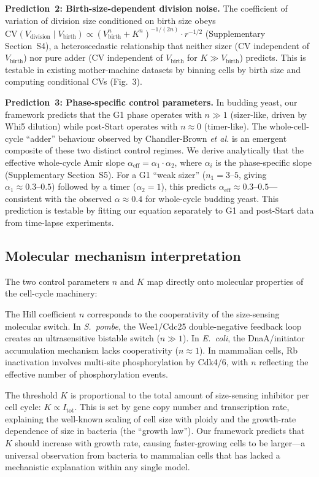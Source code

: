 \documentclass[11pt]{article}
\newcommand{\Vbirth}{V_{\text{birth}}}
\newcommand{\Vdiv}{V_{\text{division}}}
\newcommand{\Ecoli}{\textit{E.~coli}}
\newcommand{\Spombe}{\textit{S.~pombe}}
\begin{document}
\textbf{Prediction~2: Birth-size-dependent division noise.}
The coefficient of variation of division size conditioned on birth
size obeys $\mathrm{CV}(\Vdiv \mid \Vbirth) \propto
(\Vbirth^n + K^n)^{-1/(2n)} \cdot r^{-1/2}$
(Supplementary Section~S4), a heteroscedastic relationship that
neither sizer (CV independent of $\Vbirth$) nor pure adder
(CV independent of $\Vbirth$ for $K \gg \Vbirth$) predicts.
This is testable in existing mother-machine datasets by binning cells
by birth size and computing conditional CVs (Fig.~3).

\textbf{Prediction~3: Phase-specific control parameters.}
In budding yeast, our framework predicts that the G1 phase operates
with $n \gg 1$ (sizer-like, driven by Whi5
dilution\cite{schmoller2015}) while post-Start operates with
$n \approx 0$ (timer-like).  The whole-cell-cycle ``adder''
behaviour observed by Chandler-Brown \textit{et al.}\cite{chandler2017}
is an emergent composite of these two distinct control regimes.
We derive analytically that the effective whole-cycle Amir slope
$\alpha_{\mathrm{eff}} = \alpha_1 \cdot \alpha_2$, where
$\alpha_i$ is the phase-specific slope (Supplementary Section~S5).
For a G1 ``weak sizer'' ($n_1 = 3\text{--}5$, giving $\alpha_1
\approx 0.3\text{--}0.5$) followed by a timer ($\alpha_2 = 1$),
this predicts $\alpha_{\mathrm{eff}} \approx 0.3\text{--}0.5$---
consistent with the observed $\alpha \approx 0.4$ for whole-cycle
budding yeast.  This prediction is testable by fitting our equation
separately to G1 and post-Start data from time-lapse experiments.

\subsection*{Molecular mechanism interpretation}

The two control parameters $n$ and $K$ map directly onto molecular
properties of the cell-cycle machinery:

The Hill coefficient $n$ corresponds to the cooperativity of the
size-sensing molecular switch.  In \Spombe{}, the Wee1/Cdc25
double-negative feedback loop creates an ultrasensitive bistable
switch ($n \gg 1$)\cite{wood2015}.  In \Ecoli{}, the DnaA/initiator
accumulation mechanism lacks cooperativity ($n \approx
1$)\cite{si2019,zheng2020}.  In mammalian cells, Rb
inactivation involves multi-site phosphorylation by Cdk4/6, with
$n$ reflecting the effective number of phosphorylation
events\cite{zatulovskiy2020}.

The threshold $K$ is proportional to the total amount of
size-sensing inhibitor per cell cycle: $K \propto
I_{\mathrm{tot}}$.  This is set by gene copy number and
transcription rate, explaining the well-known scaling of cell size
with ploidy\cite{ginzberg2015} and the growth-rate dependence of
size in bacteria (the ``growth law'')\cite{zheng2020}.  Our
framework predicts that $K$ should increase with growth rate,
causing faster-growing cells to be larger---a universal observation
from bacteria to mammalian cells that has lacked a mechanistic
explanation within any single model.
\end{document}
